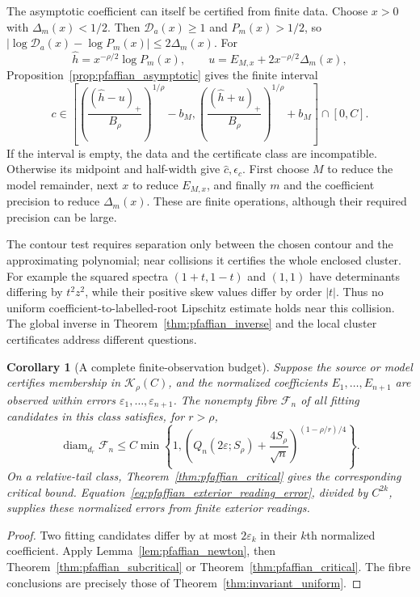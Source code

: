 \documentclass[11pt,a4paper]{amsart}
\numberwithin{equation}{section}
\newtheorem{corollary}[theorem]{Corollary}
\theoremstyle{definition}
\theoremstyle{remark}
\begin{document}
The asymptotic coefficient can itself be certified from finite data. Choose $x>0$ with $\Delta_m(x)<1/2$. Then $\mathscr D_a(x)\ge1$ and $P_m(x)>1/2$, so
$|\log\mathscr D_a(x)-\log P_m(x)|\le2\Delta_m(x)$.
For
\[
 \widehat h=x^{-\rho/2}\log P_m(x),\qquad
 u=E_{M,x}+2x^{-\rho/2}\Delta_m(x),
\]
Proposition~\ref{prop:pfaffian_asymptotic} gives the finite interval
\begin{equation}\label{eq:pfaffian_tail_interval}
 c\in\left[
 \left(\frac{(\widehat h-u)_+}{B_\rho}\right)^{1/\rho}-b_M,
 \left(\frac{(\widehat h+u)_+}{B_\rho}\right)^{1/\rho}+b_M
 \right]\cap[0,C].
\end{equation}
If the interval is empty, the data and the certificate class are incompatible. Otherwise its midpoint and half-width give $\widehat c,\epsilon_c$. First choose $M$ to reduce the model remainder, next $x$ to reduce $E_{M,x}$, and finally $m$ and the coefficient precision to reduce $\Delta_m(x)$. These are finite operations, although their required precision can be large.

The contour test requires separation only between the chosen contour and the approximating polynomial; near collisions it certifies the whole enclosed cluster. For example the squared spectra $(1+t,1-t)$ and $(1,1)$ have determinants differing by $t^2z^2$, while their positive skew values differ by order $|t|$. Thus no uniform coefficient-to-labelled-root Lipschitz estimate holds near this collision. The global inverse in Theorem~\ref{thm:pfaffian_inverse} and the local cluster certificates address different questions.

\begin{corollary}[A complete finite-observation budget]\label{cor:pfaffian_finite_budget}
Suppose the source or model certifies membership in $\mathcal K_\rho(C)$, and the normalized coefficients $E_1,\ldots,E_{n+1}$ are observed within errors $\varepsilon_1,\ldots,\varepsilon_{n+1}$. The nonempty fibre $\mathcal F_n$ of all fitting candidates in this class satisfies, for $r>\rho$,
\begin{equation}\label{eq:pfaffian_fibre_error}
 \operatorname{diam}_{d_r}\mathcal F_n
 \le C\min\left\{1,
 \left(Q_n(2\varepsilon;S_\rho)+\frac{4S_\rho}{\sqrt n}\right)^{(1-\rho/r)/4}\right\}.
\end{equation}
On a relative-tail class, Theorem~\ref{thm:pfaffian_critical} gives the corresponding critical bound. Equation~\eqref{eq:pfaffian_exterior_reading_error}, divided by $C^{2k}$, supplies these normalized errors from finite exterior readings.
\end{corollary}
\begin{proof}
Two fitting candidates differ by at most $2\varepsilon_k$ in their $k$th normalized coefficient. Apply Lemma~\ref{lem:pfaffian_newton}, then Theorem~\ref{thm:pfaffian_subcritical} or Theorem~\ref{thm:pfaffian_critical}. The fibre conclusions are precisely those of Theorem~\ref{thm:invariant_uniform}.
\end{proof}
\end{document}
